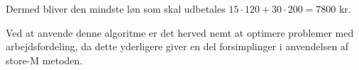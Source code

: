 \begin{eks}
Dermed bliver den mindste løn som skal udbetales $15 \cdot 120 + 30 \cdot 200 = 7800$ kr.

\end{eks}

Ved at anvende denne algoritme er det herved nemt at optimere problemer med arbejdsfordeling, da dette yderligere giver en del forsimplinger i anvendelsen af store-M metoden. 
